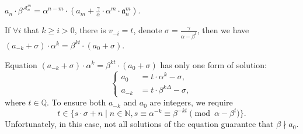 \begin{corollary}
    $a_n \cdot \beta^{\mathcal{A}_{n}^{m}} = \alpha^{n-m} \cdot\left(a_m + \frac{\gamma}{\alpha}\cdot\alpha^{m}\cdot\mathfrak{a}_{n}^{m}\right)$.
\end{corollary}
\begin{corollary}
    If $\forall i$ that $k \ge i > 0$, there is $v_{-i} = t$, denote $\sigma = \frac{\gamma}{\alpha-\beta^{t}}$, then we have
    $(a_{-k} + \sigma) \cdot \alpha^k  = \beta^{kt} \cdot (a_0 + \sigma)$.
\end{corollary}
Equation $(a_{-k} + \sigma) \cdot \alpha^k  = \beta^{kt} \cdot (a_0 + \sigma)$ has only one form of solution:
\[\left\{\begin{aligned}
    a_{0} &= t \cdot \alpha^k - \sigma, \\
    a_{-k} &= t \cdot \beta^{k\Delta} - \sigma,
\end{aligned}\right.\]
where $t \in \mathbb{Q}$.
To ensure both $a_{-k}$ and $a_0$ are integers, we require
\[ t \in \{s\cdot\sigma+n \mid n \in \mathbb{N}, s \equiv \alpha^{-k} \equiv \beta^{-kt} \pmod{\alpha - \beta^{t}}\}. \]
Unfortunately, in this case, not all solutions of the equation guarantee that $\beta \nmid a_0$.
